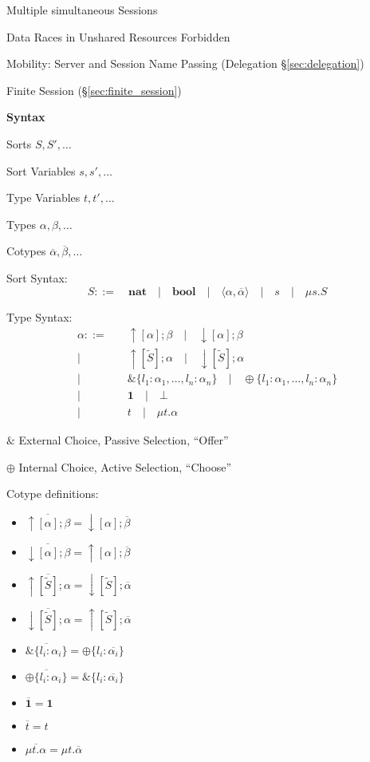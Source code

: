 Multiple simultaneous Sessions

Data Races in Unshared Resources Forbidden

Mobility: Server and Session Name Passing (Delegation
\S\ref{sec:delegation})

Finite Session (\S\ref{sec:finite_session})


\textbf{Syntax}
\cite{honda-vasconcelos-kubo98}

Sorts $S, S', \ldots$

Sort Variables $s, s', \dots$

Type Variables $t, t', \ldots$

Types $\alpha, \beta, \ldots$

Cotypes $\overline{\alpha}, \overline{\beta}, \ldots$ %

Sort Syntax:
\cite{honda-vasconcelos-kubo98}
\[
  S ::= \quad \mathbf{nat} \quad
      | \quad \mathbf{bool} \quad
      | \quad \langle \alpha, \overline{\alpha} \rangle \quad
      | \quad s \quad
      | \quad \mu s.S
\]

Type Syntax:
\cite{honda-vasconcelos-kubo98}
\[
\begin{split}
  \alpha  ::=&\quad \uparrow[\alpha]; \beta \quad
            | \quad \downarrow[\alpha]; \beta \\
            |&\quad \uparrow[\tilde{S}]; \alpha \quad
            | \quad \downarrow[\tilde{S}]; \alpha \\
            |&\quad \& \{ l_1 : \alpha_1, \ldots, l_n : \alpha_n \} \quad
            | \quad \oplus \{ l_1 : \alpha_1, \ldots, l_n : \alpha_n \} \\
            |&\quad \mathbf{1} \quad
            | \quad \bot \quad \\
            |&\quad t \quad
            | \quad \mu t.\alpha
\end{split}
\]

$\&$ External Choice, Passive Selection, ``Offer''

$\oplus$ Internal Choice, Active Selection, ``Choose''


Cotype definitions:
\cite{honda-vasconcelos-kubo98}
\begin{itemize}
  \item $\overline{\uparrow[\alpha]; \beta}
    = \downarrow[\alpha]; \overline{\beta}$
  \item $\overline{\downarrow[\alpha]; \beta}
    = \uparrow[\alpha]; \overline{\beta}$
  \item $\overline{\uparrow[\tilde{S}]; \alpha}
    = \downarrow[\tilde{S}]; \overline{\alpha}$
  \item $\overline{\downarrow[\tilde{S}]; \alpha}
    = \uparrow[\tilde{S}]; \overline{\alpha}$
  \item $\overline{\& \{ l_i : \alpha_i \}}
    = \oplus \{ l_i : \overline{\alpha_i} \}$
  \item $\overline{\oplus \{ l_i : \alpha_i \}}
    = \& \{ l_i : \overline{\alpha_i} \}$
  \item $\overline{\mathbf{1}} = \mathbf{1}$
  \item $\overline{t} = t$
  \item $\overline{\mu t.\alpha} = \mu t.\overline{\alpha}$
\end{itemize}


